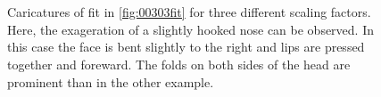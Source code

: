 \begin{figure}[h!]
    \centering
    \\
    \\
    \caption{Caricatures of fit in \ref{fig:00303fit} for three different scaling factors. Here, the exageration of a slightly hooked nose can be observed. In this case the face is bent slightly to the right and lips are pressed together and foreward. The folds on both sides of the head are prominent than in the other example.} 
\label{fig:00303_caricature}
\end{figure}

